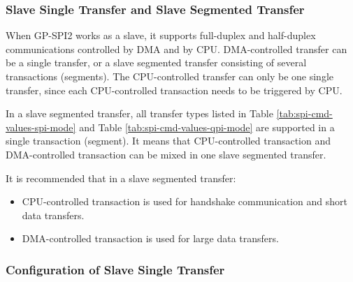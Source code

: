 \documentclass[main\_\_EN.tex]{subfiles}
\begin{document}
\subsubsection{Slave Single Transfer and Slave Segmented Transfer}\label{sec:spi-slave-single-seg-trans}

When GP-SPI2 works as a slave, it supports full-duplex and half-duplex communications controlled by DMA and by CPU. DMA-controlled transfer can be a single transfer, or a slave segmented transfer consisting of several transactions (segments). The CPU-controlled transfer can only be one single transfer, since each CPU-controlled transaction needs to be triggered by CPU.

In a slave segmented transfer, all transfer types listed in Table \ref{tab:spi-cmd-values-spi-mode} and Table \ref{tab:spi-cmd-values-qpi-mode} are supported in a single transaction (segment). It means that CPU-controlled transaction and DMA-controlled transaction can be mixed in one slave segmented transfer.

It is recommended that in a slave segmented transfer:

\begin{itemize}
    \item CPU-controlled transaction is used for handshake communication and short data transfers.

    \item  DMA-controlled transaction is used for large data transfers.
\end{itemize}


\subsubsection{Configuration of Slave Single Transfer}\label{sec:spi-config-slave-single-trans}
\end{document}
